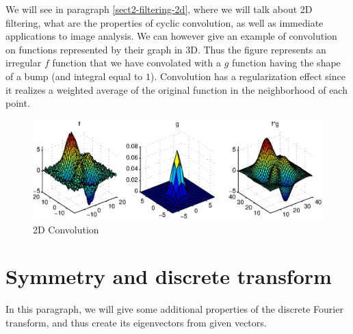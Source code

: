  
We will see in paragraph \ref{sect2-filtering-2d}, where we will talk about 2D filtering, what are the  properties of cyclic convolution, as well as immediate applications to image analysis. We can however give an example of convolution on functions represented by their graph in 3D. Thus the figure  represents an irregular $ f $ function that we have convolated with a $ g $ function having the shape of a bump (and integral equal to $ 1 $). Convolution has a regularization effect since it realizes a weighted average of the original function in the neighborhood of each point. \begin{figure}[ht]
    \begin{center}
    \includegraphics [scale = 0.8]{images/convolution-2d.eps}
    \end{center}
    \caption{2D Convolution}
              \label{fig-convolution-2d}
\end{figure}
 
\section{Symmetry and discrete transform}
\label{sect1-symetrie-tfd} 
 
 In this paragraph, we will give some additional properties of the discrete Fourier transform, and thus create its eigenvectors from given vectors.
